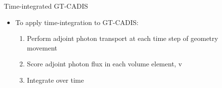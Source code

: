 \documentclass{beamer}
\begin{document}
\begin{frame}{Time-integrated GT-CADIS}
	\begin{itemize}
		\item{To apply time-integration to GT-CADIS:}
			\begin{enumerate}
				\item{Perform adjoint photon transport at each
					time step of geometry movement}
				\item{Score adjoint photon flux in each volume
					element, v}
				\item{Integrate over time}
			\end{enumerate}
	\end{itemize}

\end{frame}
\end{document}
